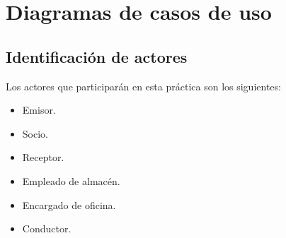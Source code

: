 \documentclass[12pt,spanish]{article}
\begin{document}
\section{Diagramas de casos de uso}

\subsection{Identificación de actores}
Los actores que participarán en esta práctica son los siguientes:
\begin{itemize}
\item Emisor.
\item Socio.
\item Receptor.
\item Empleado de almacén.
\item Encargado de oficina.
\item Conductor.
\end{itemize}
\end{document}
